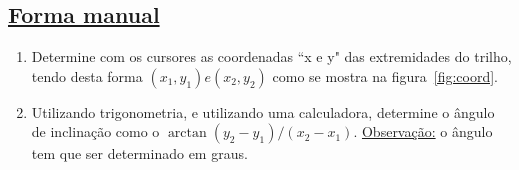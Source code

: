 \vspace{-0.7cm}
\subsection*{\underline{Forma manual}}
\vspace{-0.2cm}
\begin{enumerate}
\item Determine com os cursores as coordenadas ``x e y" das extremidades do trilho, tendo desta forma $(x_1,y_1) e (x_2, y_2)$ como se mostra na figura~\ref{fig:coord}.
\item Utilizando trigonometria, e utilizando uma calculadora, determine o ângulo de inclinação como o $\arctan{(y_2-y_1)/(x_2-x_1)}$. \underline{Observação:} o ângulo tem que ser determinado em graus.
\end{enumerate}

\vspace{-0.9cm}
